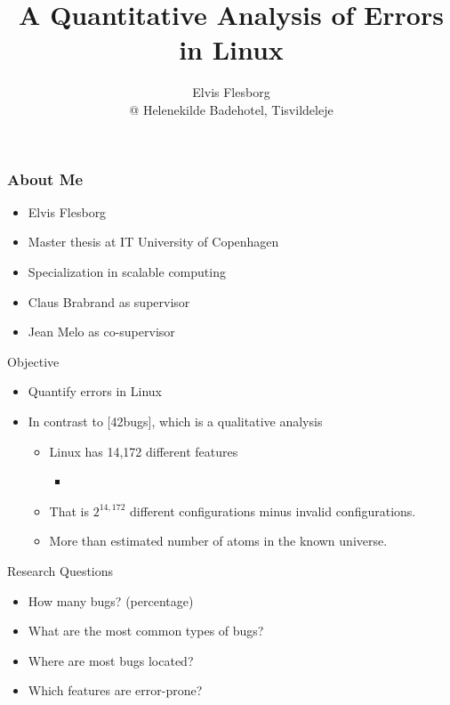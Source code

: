 \documentclass[mathserif,serif]{beamer}
\title{A Quantitative Analysis of Errors in Linux}
\subtitle{Elvis Flesborg \\ @ Helenekilde Badehotel, Tisvildeleje}
\newenvironment{items}{
\begin{itemize}
  \setlength{\itemsep}{0pt}
  \setlength{\parskip}{7pt}
  \setlength{\parsep}{4pt}
}{\end{itemize}}
\begin{document}
\frame{\titlepage}

\begin{frame}[t]
    \frametitle{About Me}

    \begin{items}
        \item Elvis Flesborg
        \item Master thesis at IT University of Copenhagen
        \item Specialization in scalable computing
        \item Claus Brabrand as supervisor
        \item Jean Melo as co-supervisor
    \end{items}
\end{frame}

\begin{frame}[t]{Objective}
    

    \begin{items}
        \item Quantify errors in Linux
        \pause
        \item In contrast to [42bugs], which is a qualitative analysis
        \pause
        \begin{items}
            \item Linux has 14,172 different features
            \begin{items}
                \item {}
            \end{items}
            \item That is \underline{$2^{14,172}$} different configurations minus invalid 
                configurations.
            \item More than estimated number of atoms in the known universe.
        \end{items}
    \end{items}

\end{frame}

\begin{frame}[t]{Research Questions}

    \begin{items}
        \item How many bugs? (percentage)
        \pause
        \item What are the most common types of bugs?
        \pause
        \item Where are most bugs located?
        \pause
        \item Which features are error-prone?
    \end{items}
\end{frame}
\end{document}
